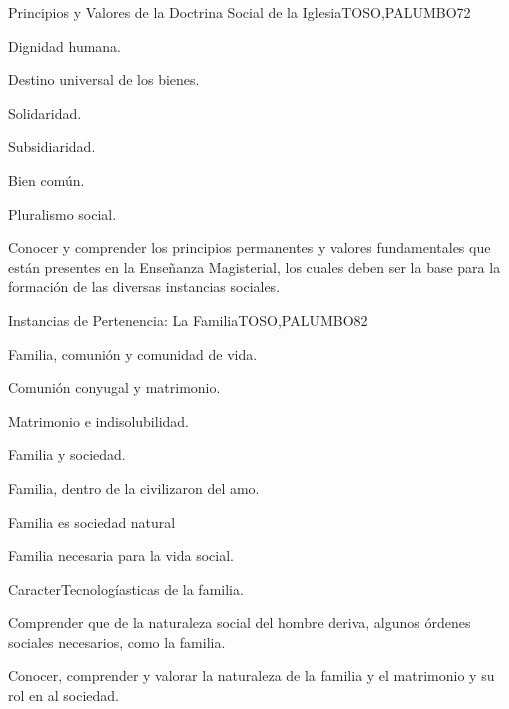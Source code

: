 \begin{syllabus}
\begin{unit}{Principios y Valores de la Doctrina Social de  la Iglesia}{TOSO,PALUMBO}{7}{2}
\begin{topics}
	\item Dignidad humana.
	\item Destino universal de los bienes.
	\item Solidaridad.
	\item Subsidiaridad.
	\item Bien común.
	\item Pluralismo social. 
\end{topics}
\begin{learningoutcomes}
	\item Conocer y comprender los principios permanentes y valores fundamentales que están presentes en la Enseñanza Magisterial, los cuales deben ser la base para la formación de las diversas instancias sociales.
\end{learningoutcomes}
\end{unit}

\begin{unit}{Instancias de Pertenencia: La Familia}{TOSO,PALUMBO}{8}{2}
\begin{topics}
	\item Familia, comunión y comunidad de vida.
	\item Comunión conyugal y matrimonio. 
	\item Matrimonio e indisolubilidad.
	\item Familia y sociedad.
	\item Familia, dentro de la civilizaron del amo.
	\item Familia es sociedad natural
	\item Familia necesaria para la vida social.
	\item CaracterTecnologíasticas de la familia.
\end{topics}
\begin{learningoutcomes}
	\item Comprender que de la naturaleza social del hombre deriva, algunos órdenes sociales necesarios, como la familia.
	\item Conocer, comprender y valorar la naturaleza de la familia y el matrimonio y su rol en al sociedad.
\end{learningoutcomes}
\end{unit}


\end{syllabus}
